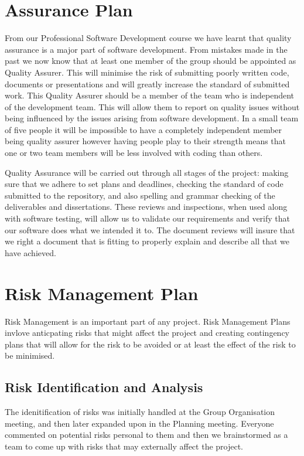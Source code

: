 \documentclass{l3proj}
\begin{document}
\section{Assurance Plan}
\label{sect:a-plan}                                                                               
From our Professional Software Development course we have learnt that quality assurance is a major part of software development. From mistakes made in the past we now know that at least one member of the group should be appointed as Quality Assurer. This will minimise the risk of submitting poorly written code, documents or presentations and will greatly increase the standard of submitted work. This Quality Assurer should be a member of the team who is independent of the development team. This will allow them to report on quality issues without being influenced by the issues arising from software development. In a small team of five people it will be impossible to have a completely independent member being quality assurer however having people play to their strength means that one or two team members will be less involved with coding than others.

Quality Assurance will be carried out through all stages of the project: making sure that we adhere to set plans and deadlines, checking the standard of code submitted to the repository, and also spelling and grammar checking of the deliverables and dissertations.
These reviews and inspections, when used along with software testing, will allow us to validate our requirements and verify that our software does what we intended it to. The document reviews will insure that we right a document that is fitting to properly explain and describe all that we have achieved.

\section{Risk Management Plan}
\label{sect:risk-man}
Risk Management is an important part of any project. Risk Management Plans invlove anticpating risks that might affect the project and creating contingency plans that will allow for the risk to be avoided or at least the effect of the risk to be minimised.
\subsection{Risk Identification and Analysis} 
The idenitification of risks was initially handled at the Group Organisation meeting, and then later expanded upon in the Planning meeting. Everyone commented on potential risks personal to them and then we brainstormed as a team to come up with risks that may externally affect the project.
\end{document}
